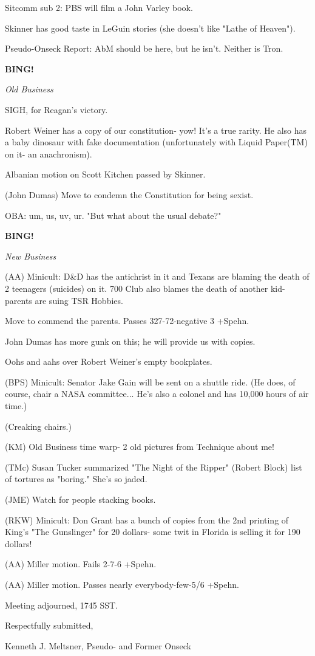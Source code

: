 \documentclass[12pt]{article}
\newcommand{\bing}{{\bf BING!} }
\newcommand{\goto}[1]{\bing \vskip 12pt \centerline{{\em{#1}}}}
\begin{document}
Sitcomm sub 2: PBS will film a John Varley book.

Skinner has good taste in LeGuin stories (she doesn't like "Lathe of Heaven").

Pseudo-Onseck Report: AbM should be here, but he isn't. Neither is Tron.

\goto{Old Business}

SIGH, for Reagan's victory.

Robert Weiner has a copy of our constitution- yow! It's a true rarity. He also has a baby dinosaur with fake documentation (unfortunately with Liquid Paper(TM) on it- an anachronism).

Albanian motion on Scott Kitchen passed by Skinner.

(John Dumas) Move to condemn the Constitution for being sexist.

OBA: um, us, uv, ur. "But what about the usual debate?"

\goto{New Business}

(AA) Minicult: D&D has the antichrist in it and Texans are blaming the death of 2 teenagers (suicides) on it. 700 Club also blames the death of another kid- parents are suing TSR Hobbies.

Move to commend the parents. Passes 327-72-negative 3 +Spehn.

John Dumas has more gunk on this; he will provide us with copies.

Oohs and aahs over Robert Weiner's empty bookplates.

(BPS) Minicult: Senator Jake Gain will be sent on a shuttle ride. (He does, of course, chair a NASA committee... He's also a colonel and has 10,000 hours of air time.)

(Creaking chairs.)

(KM) Old Business time warp- 2 old pictures from Technique about me!

(TMc) Susan Tucker summarized "The Night of the Ripper" (Robert Block) list of tortures as "boring." She's so jaded.

(JME) Watch for people stacking books.

(RKW) Minicult: Don Grant has a bunch of copies from the 2nd printing of King's "The Gunslinger" for 20 dollars- some twit in Florida is selling it for 190 dollars!

(AA) Miller motion. Fails 2-7-6 +Spehn.

(AA) Miller motion. Passes nearly everybody-few-5/6 +Spehn.

\vspace{12pt}

\noindent
Meeting adjourned, 1745 SST.

\vspace{18pt}

\centerline{Respectfully submitted,}
\centerline{Kenneth J. Meltsner, Pseudo- and Former Onseck}
\end{document}
